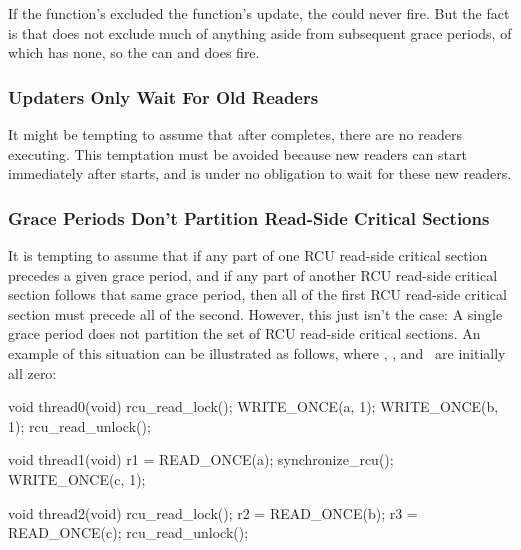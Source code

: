 If the  function's  excluded the
 function's update, the  could never fire.
But
the fact is that  does not exclude much of anything
aside from subsequent grace periods, of which  has none, so
the  can and does fire.


\subsubsection{Updaters Only Wait For Old Readers}

It might be tempting to assume that after 
completes, there are no readers executing.
This temptation must be
avoided because new readers can start immediately after
 starts, and  is under no
obligation to wait for these new readers.

\QuickQuizEnd


\subsubsection{Grace Periods Don't Partition Read-Side Critical Sections}

It is tempting to assume that if any part of one RCU read-side critical
section precedes a given grace period, and if any part of another RCU
read-side critical section follows that same grace period, then all of
the first RCU read-side critical section must precede all of the second.
However, this just isn't the case:
A single grace period does not
partition the set of RCU read-side critical sections.
An example of this
situation can be illustrated as follows, where , , and~
are initially all zero:

\begin{VerbatimN}
	void thread0(void)
	{
		rcu_read_lock();
		WRITE_ONCE(a, 1);
		WRITE_ONCE(b, 1);
		rcu_read_unlock();
	}

	void thread1(void)
	{
		r1 = READ_ONCE(a);
		synchronize_rcu();
		WRITE_ONCE(c, 1);
	}

	void thread2(void)
	{
		rcu_read_lock();
		r2 = READ_ONCE(b);
		r3 = READ_ONCE(c);
		rcu_read_unlock();
	}
\end{VerbatimN}

